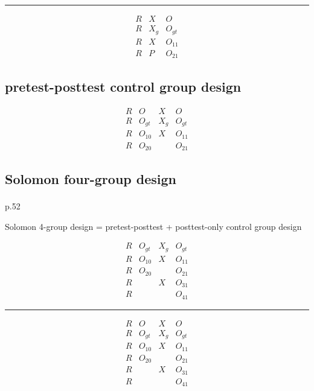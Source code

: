 \documentclass[
]{book}
\theoremstyle{definition}
\theoremstyle{definition}
\theoremstyle{definition}
\theoremstyle{definition}
\theoremstyle{remark}
\begin{document}
\begin{center}\rule{0.5\linewidth}{0.5pt}\end{center}

\[
\begin{array}{ccc}
R & X & O\\
R & X_{g} & O_{gt}\\
R & X & O_{11}\\
R & P & O_{21}
\end{array}
\]

\subsection{pretest-posttest control group design}\label{pretest-posttest-control-group-design}

\[
\begin{array}{cccc}
R & O & X & O\\
R & O_{gt} & X_{g} & O_{gt}\\
R & O_{10} & X & O_{11}\\
R & O_{20} &  & O_{21}
\end{array}
\]

\subsection{Solomon four-group design}\label{solomon-four-group-design}

\textsuperscript{} p.52

Solomon 4-group design = pretest-posttest + posttest-only control group design

\[
\begin{array}{cccc}
R & O_{gt} & X_{g} & O_{gt}\\
R & O_{10} & X & O_{11}\\
R & O_{20} &  & O_{21}\\
R &  & X & O_{31}\\
R &  &  & O_{41}
\end{array}
\]

\begin{center}\rule{0.5\linewidth}{0.5pt}\end{center}

\[
\begin{array}{cccc}
R & O & X & O\\
R & O_{gt} & X_{g} & O_{gt}\\
R & O_{10} & X & O_{11}\\
R & O_{20} &  & O_{21}\\
R &  & X & O_{31}\\
R &  &  & O_{41}
\end{array}
\]
\end{document}
